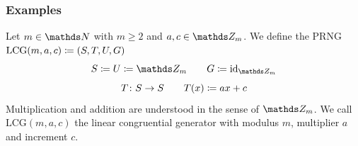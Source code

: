 \documentclass{stdlocal}
\begin{document}
    \subsubsection{Examples}
      \begin{definition}
        Let $m\in\setNatural$ with $m\geq 2$ and $a,c\in\setInteger_m$.
        We define the PRNG $\mathrm{LCG}(m,a,c) \coloneqq (S,T,U,G)$
        \[
          S \define U \define \setInteger_m
          \separate
          G \define \identity_{\setInteger_m}
        \]
        \[
          T\colon S\to S
          \qquad
          T(x) \coloneqq a x + c
        \]
        Multiplication and addition are understood in the sense of $\setInteger_m$.
        We call $\mathrm{LCG}(m,a,c)$ the linear congruential generator with modulus $m$, multiplier $a$ and increment $c$.
      \end{definition}
\end{document}
